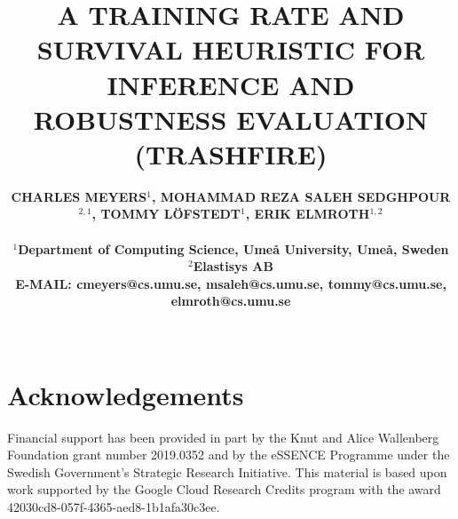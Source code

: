 \documentclass[a4paper, times, 10pt,twocolumn]{article}
\begin{document}
\title{A TRAINING RATE AND SURVIVAL HEURISTIC FOR INFERENCE AND ROBUSTNESS EVALUATION (TRASHFIRE)}
\author{\bf{\normalsize{CHARLES MEYERS${^1}$, MOHAMMAD REZA SALEH SEDGHPOUR${^{2,1}}$, TOMMY L\"{O}FSTEDT${^1}$, ERIK ELMROTH${^{1,2}}$}}\\ 
\\
\normalsize{$^1$Department of Computing Science, Ume{\aa} University, {Ume\aa}, Sweden}\\
\normalsize{$^2$Elastisys AB} \\
\normalsize{E-MAIL: cmeyers@cs.umu.se, msaleh@cs.umu.se, tommy@cs.umu.se, elmroth@cs.umu.se}\\
\\}


\maketitle







\section*{Acknowledgements}
Financial support has been provided in part by the Knut and Alice Wallenberg Foundation grant number 2019.0352 and by the eSSENCE Programme under the Swedish Government's Strategic Research Initiative.
This material is based upon work supported by the Google Cloud Research Credits program with the award 42030cd8-057f-4365-aed8-1b1afa30c3ee.

\printbibliography
\end{document}
